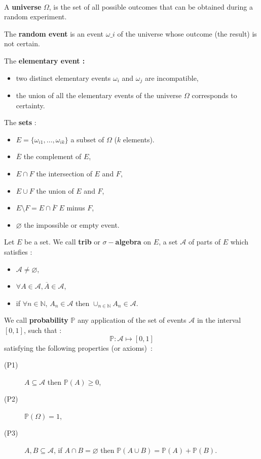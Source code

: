 
\begin{f}[Axiomatic]{\ }
	
	A \textbf{universe} $\Omega$, is the set of all possible outcomes that can be obtained during a random experiment.
	
	The \textbf{random event} is an event $\omega\_i$ of the universe whose outcome (the result) is not certain.
	
	
	The \textbf{elementary event :}
	\begin{itemize}
		\item two distinct elementary events $\omega_i$ and $\omega_j$ are incompatible,
		\item the union of all the elementary events of the universe $\Omega $ corresponds to certainty.
	\end{itemize}
	
	The \textbf{sets} :
	\begin{itemize}
		\item $E=\lbrace \omega_{i1},\ldots , \omega_{ik}\rbrace$ a subset of $\Omega$ ($k$ elements).
		\item $\overline{E}$ the complement of $E$,
		\item $E\cap F$ the intersection of $E$ and $F$,
		\item $E\cup F$ the union of $E$ and $F$,
		\item $E\setminus F= E\cap\overline{F}$ $E$ minus $F$,
		\item $\varnothing$ the impossible or empty event.
	\end{itemize}
	
	Let $E$ be a set. We call \textbf{trib} or \textbf{$\sigma-$algebra} on $E$, a set $\mathcal{A}$ of parts of $E$ which satisfies :
	\begin{itemize}
		\item     $\mathcal{A} \not=\varnothing$,
		\item     $\forall A \in \mathcal{A} , \overline{A} \in\mathcal{A}$,
		\item     if $\forall n \in \mathbb{N}$, $A_n \in\mathcal{A}$ then $\cup_{n\in\mathbb{N} } A_n \in\mathcal{A}$.
	\end{itemize}
	
	We call \textbf{probability} $\mathbb{P}$ any application of the set of events $\mathcal{A}$ in the interval $[0,1]$, such that :      $$\mathbb{P} :      \mathcal{A}  \mapsto   [0,1]$$
	satisfying the following properties (or axioms)~:
	\begin{description}
		\item[(P1)] $A \subseteq \mathcal{A} $    then  $ \mathbb{P}(A) \geq 0$,
		\item[(P2)] $ \mathbb{P}(\Omega) = 1$,
		\item[(P3)] $A, B \subseteq \mathcal{A}$,  if  $A\cap B =\varnothing$    then   $\mathbb{P}(A\cup B)=\mathbb{P}(A) + \mathbb{P}(B)$.
	\end{description}
	

\end{f}
